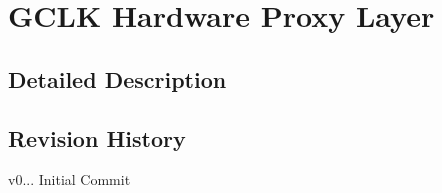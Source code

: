 \hypertarget{group__gclk__group}{}\section{G\+C\+LK Hardware Proxy Layer}
\label{group__gclk__group}


\subsection{Detailed Description}
\hypertarget{group__gclk__group_gclk_hpl_rev}{}\subsection{Revision History}\label{group__gclk__group_gclk_hpl_rev}

\begin{DoxyItemize}
\item v0... Initial Commit 
\end{DoxyItemize}